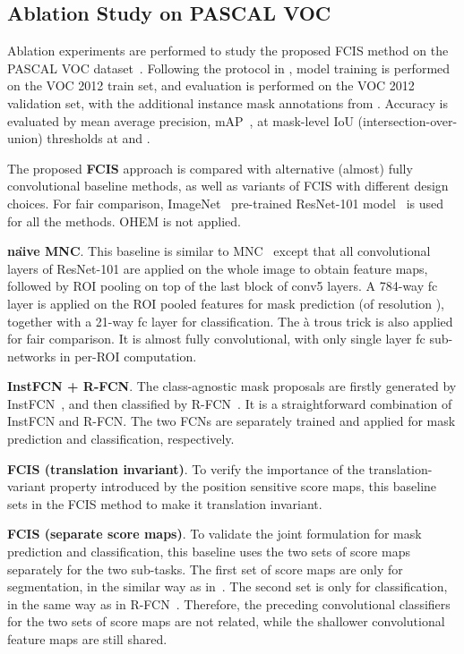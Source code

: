 \documentclass[10pt,twocolumn,letterpaper]{article}
\begin{document}
\subsection{Ablation Study on PASCAL VOC}
\label{sec.exp}

Ablation experiments are performed to study the proposed FCIS method on the PASCAL VOC dataset~\cite{everingham2010pascal}. Following the protocol in \cite{hariharan2014simultaneous,dai2015convolutional,hariharan2015hyper,dai2016mnc}, model training is performed on the VOC 2012 train set, and evaluation is performed on the VOC 2012 validation set, with the additional instance mask annotations from \cite{hariharan2011semantic}. Accuracy is evaluated by mean average precision, mAP~\cite{hariharan2014simultaneous}, at mask-level IoU (intersection-over-union) thresholds at  and .

The proposed \textbf{FCIS} approach is compared with alternative (almost) fully convolutional baseline methods, as well as variants of FCIS with different design choices. For fair comparison, ImageNet~\cite{deng2009imagenet} pre-trained ResNet-101 model~\cite{he2016deep} is used for all the methods. OHEM is not applied.

\textbf{na\"{\i}ve MNC}. This baseline is similar to MNC~\cite{dai2016mnc} except that all convolutional layers of ResNet-101 are applied on the whole image to obtain feature maps, followed by ROI pooling on top of the last block of conv5 layers. A 784-way fc layer is applied on the ROI pooled features for mask prediction (of resolution ), together with a 21-way fc layer for classification. The \`{a} trous trick is also applied for fair comparison. It is almost fully convolutional, with only single layer fc sub-networks in per-ROI computation.

\textbf{InstFCN + R-FCN}. The class-agnostic mask proposals are firstly generated by InstFCN~\cite{dai2016instance}, and then classified by R-FCN~\cite{dai2016rfcn}. It is a straightforward combination of InstFCN and R-FCN. The two FCNs are separately trained and applied for mask prediction and classification, respectively.

\textbf{FCIS (translation invariant)}. To verify the importance of the translation-variant property introduced by the position sensitive score maps, this baseline sets  in the FCIS method to make it translation invariant.

\textbf{FCIS (separate score maps)}. To validate the joint formulation for mask prediction and classification, this baseline uses the two sets of score maps separately for the two sub-tasks. The first set of  score maps are only for segmentation, in the similar way as in~\cite{dai2016instance}. The second set is only for classification, in the same way as in R-FCN~\cite{dai2016rfcn}. Therefore, the preceding convolutional classifiers for the two sets of score maps are not related, while the shallower convolutional feature maps are still shared.
\end{document}
